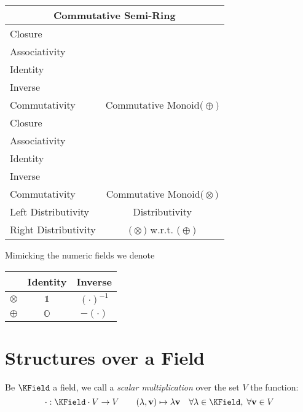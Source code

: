 \documentclass[a4paper,12pt]{scrartcl}    %
\newcommand{\OpA}{\otimes}
\newcommand{\OpB}{\oplus}
\begin{document}
\begin{minipage}[c]{0,5\textwidth}
\vspace{0.6cm}
\begin{tabular}{|l|c|} %
  \hline
  \multicolumn{2}{c}{\cellcolor{green!25}Commutative Semi-Ring} \\
  \hline
    \cellcolor{blue!25} Closure& \cellcolor{yellow!25}  \\
    \cellcolor{blue!25} Associativity& \cellcolor{yellow!25}  \\
    \cellcolor{blue!25} Identity& \cellcolor{yellow!25} \\
    \cellcolor{red!25} Inverse& \cellcolor{yellow!25} \\
    \cellcolor{blue!25} Commutativity& \multirow{-5}{*}{\tiny\cellcolor{yellow!25}Commutative Monoid$\big(\OpB\big)$} \\
   \hline
    \cellcolor{blue!25} Closure& \cellcolor{yellow!25}  \\
    \cellcolor{blue!25} Associativity& \cellcolor{yellow!25}  \\
    \cellcolor{blue!25} Identity& \cellcolor{yellow!25} \\
    \cellcolor{red!25} Inverse& \cellcolor{yellow!25} \\
    \cellcolor{blue!25} Commutativity& \multirow{-5}{*}{\tiny\cellcolor{yellow!25}Commutative Monoid$\big(\OpA\big)$} \\
  \hline
  	\cellcolor{blue!25} Left Distributivity&  \tiny\cellcolor{yellow!25}Distributivity\\
    \cellcolor{blue!25} Right Distributivity & \tiny\cellcolor{yellow!25} $\big(\OpA\big)$ w.r.t. $\big(\OpB\big)$  \\
   \hline
\end{tabular}

\end{minipage}

\begin{notationfix}
	Mimicking the numeric fields we denote
	\begin{tabular}{|c|c c|}
		\hline 
			& Identity & Inverse \\
		\hline
		$\OpA$ & $\mathbb{1}$ & $(\cdot)^{-1}$\\
		$\OpB$ & $\mathbb{O}$ & $-(\cdot)$\\
		\hline
	\end{tabular}

\end{notationfix}

\newpage
\section{Structures over a Field}
Be $\KField$ a field, we call a \emph{scalar multiplication} over the set $V$ the function:
	\begin{displaymath}
		\cdot : \KField \cdot V \rightarrow  V \qquad (\lambda, \mathbf{v}) \mapsto \lambda \mathbf{v} \quad \forall \lambda \in \KField,\; 
		\forall \mathbf{v} \in V
	\end{displaymath}
\end{document}
